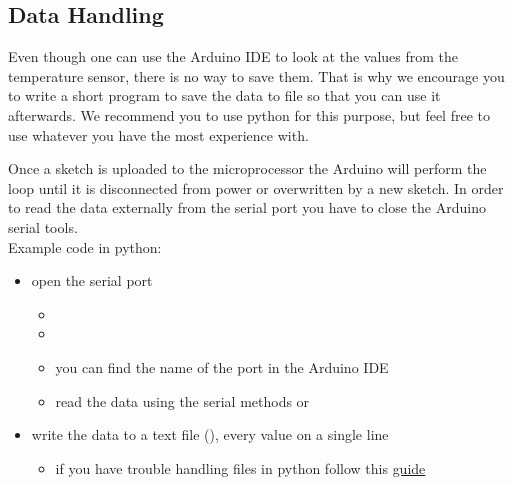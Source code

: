 \subsection{Data Handling}\label{sec:data}
Even though one can use the Arduino \ac{IDE} to look at the values from the temperature sensor, there is no way to save them. That is why we encourage you to write a short program to save the data to file so that you can use it afterwards. We recommend you to use python for this purpose, but feel free to use whatever you have the most experience with.\par
Once a sketch is uploaded to the microprocessor the Arduino will perform the loop until it is disconnected from power or overwritten by a new sketch. In order to read the data externally from the serial port you have to close the Arduino serial tools.\\
Example code in python:
\begin{itemize}
	\item open the serial port
	\begin{itemize}
		\item {}
		\item {}
		\item you can find the name of the port in the Arduino \ac{IDE}
		\item read the data using the serial methods  or   
	\end{itemize}
	\item write the data to a text file (), every value on a single line
	\begin{itemize}
		\item if you have trouble handling files in python follow this \href{http://www.pythonforbeginners.com/files/reading-and-writing-files-in-python}{guide}
	\end{itemize}
\end{itemize}

